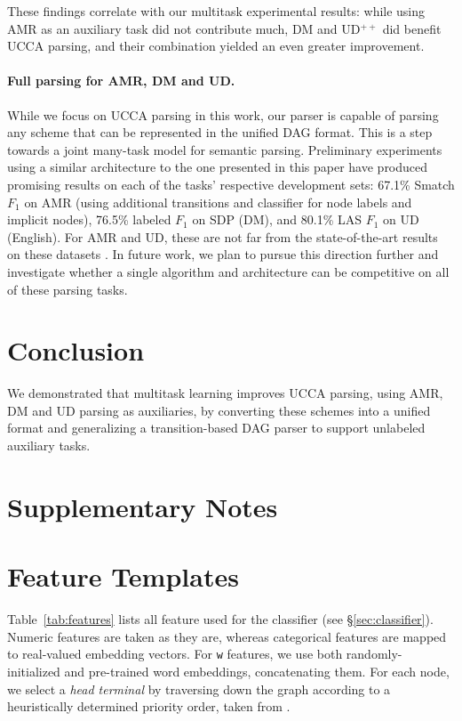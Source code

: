 \documentclass[11pt,a4paper]{article}
\begin{document}
These findings correlate with our multitask experimental results:
while using AMR as an auxiliary task did not contribute much, DM and UD$^{++}$ did benefit UCCA
parsing, and their combination yielded an even greater improvement.

\paragraph{Full parsing for AMR, DM and UD.}
While we focus on UCCA parsing in this work, our parser is capable of parsing any
scheme that can be represented in the unified DAG format.
This is a step towards a joint many-task model for semantic parsing.
Preliminary experiments using a similar architecture to the one presented in this paper have produced
promising results on each of the tasks' respective development sets:
67.1\% Smatch $F_1$ \cite{cai2013smatch} on AMR
(using additional transitions and classifier for node labels and implicit nodes),
76.5\% labeled $F_1$ on SDP (DM),
and 80.1\% LAS $F_1$ on UD (English).
For AMR and UD, these are not far from the state-of-the-art results on these datasets
\cite{foland2017abstract,dozat2016deep}.
In future work, we plan to pursue this direction further and investigate whether a single
algorithm and architecture can be competitive on all of these parsing tasks.

\section{Conclusion}\label{sec:conclusion}

We demonstrated that multitask learning improves UCCA parsing,
using AMR, DM and UD parsing as auxiliaries,
by converting these schemes into a unified format
and generalizing a transition-based DAG parser to support unlabeled auxiliary tasks.






\appendix

\section*{Supplementary Notes}

\section{Feature Templates}\label{sec:features}

Table~\ref{tab:features} lists all feature used for the classifier (see \S\ref{sec:classifier}).
Numeric features are taken as they are, whereas categorical features are mapped to real-valued embedding
vectors.
For \texttt{w} features,
we use both randomly-initialized and pre-trained word embeddings, concatenating them.
For each node, we select a \textit{head terminal} by traversing down the graph according to
a heuristically determined priority order, taken from \citet{hershcovich2017a}.
\end{document}

